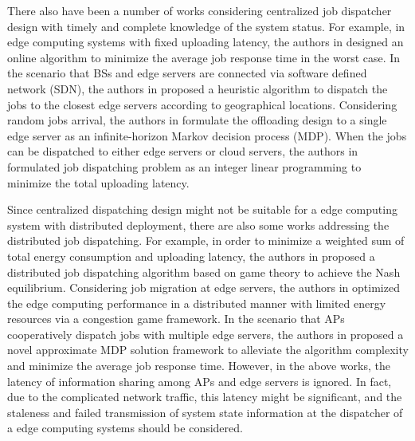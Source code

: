 There also have been a number of works considering centralized job dispatcher design with timely and complete knowledge of the system status.
For example, in edge computing systems with fixed uploading latency, the authors in \cite{tan-online} designed an online algorithm to minimize the average job response time in the worst case.
In the scenario that BSs and edge servers are connected via software defined network (SDN), the authors in \cite{IOTJ18-FanQ} proposed a heuristic algorithm to dispatch the jobs to the closest edge servers according to geographical locations.
Considering random jobs arrival, the authors in \cite{mdp-globecom,mdp-tvt} formulate the offloading design to a single edge server as an infinite-horizon Markov decision process (MDP).
When the jobs can be dispatched to either edge servers or cloud servers, the authors in \cite{MASS18-MengZ} formulated job dispatching problem as an integer linear programming to minimize the total uploading latency. %

Since centralized dispatching design might not be suitable for a edge computing system with distributed deployment, there are also some works addressing the distributed job dispatching.
For example, in order to minimize a weighted sum of total energy consumption and uploading latency, the authors in \cite{ToN-Xuchen2016} proposed a distributed job dispatching algorithm based on game theory to achieve the Nash equilibrium. 
Considering job migration at edge servers, the authors in \cite{ToN-xujie2018} optimized the edge computing performance in a distributed manner with limited energy resources via a congestion game framework.
In the scenario that APs cooperatively dispatch jobs with multiple edge servers, the authors in \cite{mdp-jcin} proposed a novel approximate MDP solution framework to alleviate the algorithm complexity and minimize the average job response time.
However, in the above works, the latency of information sharing among APs and edge servers is ignored.
In fact, due to the complicated network traffic, this latency might be significant, and the staleness {and failed transmission} of system state information at the dispatcher of a edge computing systems should be considered.

